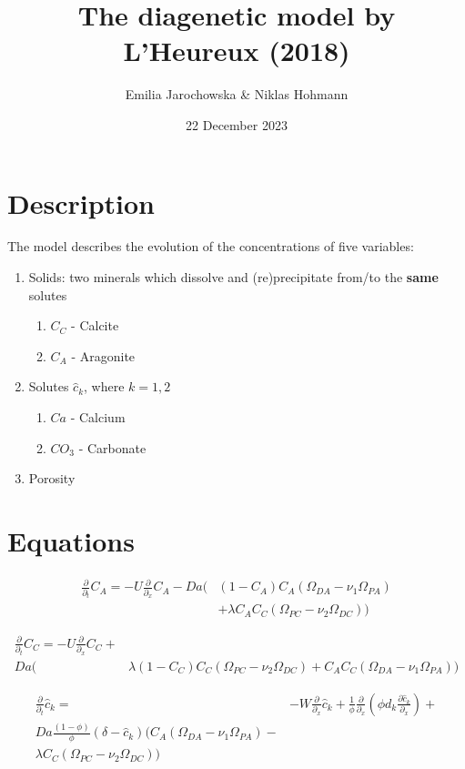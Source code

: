 \documentclass[11pt, letterpaper]{article}
\title{The diagenetic model by L'Heureux (2018)}
\author{Emilia Jarochowska & Niklas Hohmann}
\date{22 December 2023}
\begin{document}
\maketitle

\section{Description}
The model describes the evolution of the concentrations of five variables:
\begin{enumerate}
    \item Solids: two minerals which dissolve and (re)precipitate from/to the \textbf{same} solutes 
    \begin{enumerate}
        \item $C_C$ - Calcite
        \item $C_A$ - Aragonite
    \end{enumerate}
    \item Solutes $\hat{c}_k$, where $k = 1, 2$
    \begin{enumerate}
        \item $Ca$ - Calcium 
        \item $CO_3$ - Carbonate 
    \end{enumerate}
    \item Porosity
\end{enumerate}

\section{Equations}
\begin{equation}
\begin{split}
\frac{\partial}{\partial_t} C_A = -U\frac{\partial}{\partial_x} C_A - Da\big(&(1 - C_A)C_A (\Omega_{DA} - \nu_1 \Omega_{PA}) \\
        & + \lambda C_A C_C (\Omega_{PC} - \nu_2 \Omega_{DC})\big)
\end{split}
\end{equation}

\begin{equation}
\begin{split}
\frac{\partial}{\partial_t} C_C = -U\frac{\partial}{\partial_x} C_C + \\Da\big(&\lambda(1-C_C)C_C(\Omega_{PC} - \nu_2 \Omega_{DC}) + C_A C_C (\Omega_{DA} - \nu_1 \Omega_{PA})\big)
\end{split}
\end{equation}

\begin{equation}
    \begin{split}
   \frac{\partial}{\partial_t} \hat{c}_k = & -W \frac{\partial}{\partial_x} \hat{c}_k + \frac{1}{\phi} \frac{\partial}{\partial_x}\left(\phi d_k \frac{\partial\hat{c}_k}{\partial_x} \right) + \\Da \frac{(1 - \phi)}{\phi} (\delta - \hat{c}_k) \big(C_A (\Omega_{DA} - \nu_1 \Omega_{PA}) - \\\lambda C_C (\Omega_{PC} - \nu_2 \Omega_{DC})\big)     
\end{split}
\end{equation}
\end{document}

